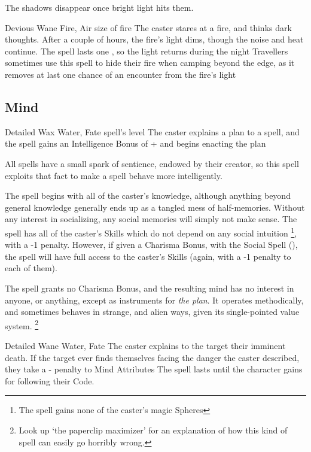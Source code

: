 \begin{multicols}{2}
{  The shadows disappear once bright light hits them.}

  {Devious}%
  {Wane}%
  {Fire, Air}%
  {size of fire}%
  {The caster stares at a fire, and thinks dark thoughts.
  After a couple of hours, the fire's light dims, though the noise and heat continue.
  The spell lasts one \showOnset, so the light returns during the night}%
  {Travellers sometimes use this spell to hide their fire when camping beyond the \gls{edge}, as it removes at last one chance of an encounter from the fire's light}

\subsection{Mind}

  {Detailed}%
  {Wax}%
  {Water, Fate}%
  {spell's level}%
  {The caster explains a plan to a spell, and the spell gains an Intelligence Bonus of + and begins enacting the plan}%
  {
  All spells have a small spark of sentience, endowed by their creator, so this spell exploits that fact to make a spell behave more intelligently.

  The spell begins with all of the caster's knowledge, although anything beyond general knowledge generally ends up as a tangled mess of half-memories.
  Without any interest in socializing, any social memories will simply not make sense.
  The spell has all of the caster's Skills which do not depend on any social intuition%
  \footnote{The spell gains none of the caster's magic Spheres},
  with a -1 penalty.
  However, if given a Charisma Bonus, with the Social Spell (), the spell will have full access to the caster's Skills (again, with a -1 penalty to each of them).

  The spell grants no Charisma Bonus, and the resulting mind has no interest in anyone, or anything, except as instruments for \emph{the plan}.
  It operates methodically, and sometimes behaves in strange, and alien ways, given its single-pointed value system.%
  \footnote{Look up `the paperclip maximizer' for an explanation of how this kind of spell can easily go horribly wrong.}
  }

\null
{}%
  {Detailed}%
  {Wane}%
  {Water, Fate}%
  {}%
  {The caster explains to the target their imminent death.
    If the target ever finds themselves facing the danger the caster described, they take a - penalty to Mind Attributes}%
  {The spell lasts until the character gains  for following their Code.}


\end{multicols}
